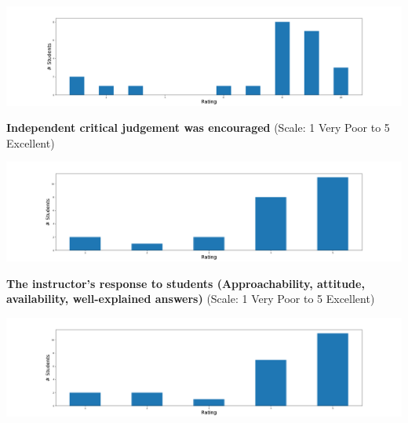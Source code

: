 \documentclass[12pt]{report}
\begin{document}
\begin{center}
\includegraphics[width=1.0\textwidth,height=0.5\textwidth]{./course-evals/Eval_1XA3_2019_Overall.png}
\end{center}

\noindent
\textbf{Independent critical judgement was encouraged} (Scale: 1 Very Poor to 5 Excellent)

\begin{center}
\includegraphics[width=1.0\textwidth,height=0.5\textwidth]{./course-evals/Eval_1XA3_2019_Critical.png}
\end{center}

\newpage
\noindent
\textbf{The instructor's response to students (Approachability, attitude,
availability, well-explained answers)} (Scale: 1 Very Poor to 5 Excellent)

\begin{center}
\includegraphics[width=1.0\textwidth,height=0.5\textwidth]{./course-evals/Eval_1XA3_2019_Response.png}
\end{center}
\end{document}
